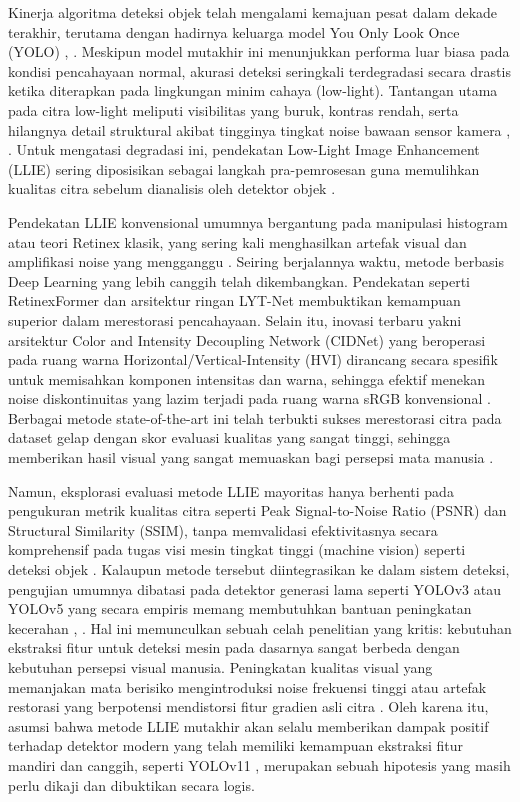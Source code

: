 \documentclass[conference]{IEEEtran}
\begin{document}
Kinerja algoritma deteksi objek telah mengalami kemajuan pesat dalam dekade terakhir, terutama dengan hadirnya keluarga model You Only Look Once (YOLO) \cite{terven2023yoloreview}, \cite{sapkota2025yoloreview}. Meskipun model mutakhir ini menunjukkan performa luar biasa pada kondisi pencahayaan normal, akurasi deteksi seringkali terdegradasi secara drastis ketika diterapkan pada lingkungan minim cahaya (low-light). Tantangan utama pada citra low-light meliputi visibilitas yang buruk, kontras rendah, serta hilangnya detail struktural akibat tingginya tingkat noise bawaan sensor kamera \cite{loh2019exdark}, \cite{gong2025multiscale}. Untuk mengatasi degradasi ini, pendekatan Low-Light Image Enhancement (LLIE) sering diposisikan sebagai langkah pra-pemrosesan guna memulihkan kualitas citra sebelum dianalisis oleh detektor objek \cite{liu2021benchmark}.

Pendekatan LLIE konvensional umumnya bergantung pada manipulasi histogram atau teori Retinex klasik, yang sering kali menghasilkan artefak visual dan amplifikasi noise yang mengganggu \cite{mpouziotas2022lowlight}. Seiring berjalannya waktu, metode berbasis Deep Learning yang lebih canggih telah dikembangkan. Pendekatan seperti RetinexFormer \cite{cai2023retinexformer} dan arsitektur ringan LYT-Net \cite{brateanu2025lytnet} membuktikan kemampuan superior dalam merestorasi pencahayaan. Selain itu, inovasi terbaru yakni arsitektur Color and Intensity Decoupling Network (CIDNet) yang beroperasi pada ruang warna Horizontal/Vertical-Intensity (HVI) dirancang secara spesifik untuk memisahkan komponen intensitas dan warna, sehingga efektif menekan noise diskontinuitas yang lazim terjadi pada ruang warna sRGB konvensional \cite{yan2025hvi}. Berbagai metode state-of-the-art ini telah terbukti sukses merestorasi citra pada dataset gelap dengan skor evaluasi kualitas yang sangat tinggi, sehingga memberikan hasil visual yang sangat memuaskan bagi persepsi mata manusia \cite{cai2023retinexformer}.

Namun, eksplorasi evaluasi metode LLIE mayoritas hanya berhenti pada pengukuran metrik kualitas citra seperti Peak Signal-to-Noise Ratio (PSNR) dan Structural Similarity (SSIM), tanpa memvalidasi efektivitasnya secara komprehensif pada tugas visi mesin tingkat tinggi (machine vision) seperti deteksi objek \cite{wu2024llieeffect}. Kalaupun metode tersebut diintegrasikan ke dalam sistem deteksi, pengujian umumnya dibatasi pada detektor generasi lama seperti YOLOv3 atau YOLOv5 yang secara empiris memang membutuhkan bantuan peningkatan kecerahan \cite{shovo2024lowlight}, \cite{wang2023yolov5lowlight}. Hal ini memunculkan sebuah celah penelitian yang kritis: kebutuhan ekstraksi fitur untuk deteksi mesin pada dasarnya sangat berbeda dengan kebutuhan persepsi visual manusia. Peningkatan kualitas visual yang memanjakan mata berisiko mengintroduksi noise frekuensi tinggi atau artefak restorasi yang berpotensi mendistorsi fitur gradien asli citra \cite{wu2024llieeffect}. Oleh karena itu, asumsi bahwa metode LLIE mutakhir akan selalu memberikan dampak positif terhadap detektor modern yang telah memiliki kemampuan ekstraksi fitur mandiri dan canggih, seperti YOLOv11 \cite{khanam2024yolov11}, merupakan sebuah hipotesis yang masih perlu dikaji dan dibuktikan secara logis.
\end{document}

